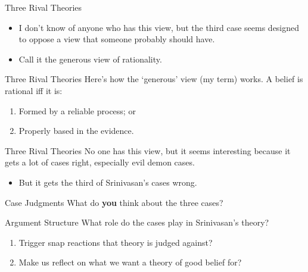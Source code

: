 \documentclass[
  17pt,
  letterpaper,
  ignorenonframetext,
  aspectratio=169,
]{beamer}
\providecommand{\tightlist}{%
  \setlength{\itemsep}{0pt}\setlength{\parskip}{0pt}}\usepackage{longtable,booktabs,array}
\begin{document}
\begin{frame}{Three Rival Theories}
\protect\hypertarget{three-rival-theories-2}{}
\begin{itemize}[<+->]
\tightlist
\item
  I don't know of anyone who has this view, but the third case seems
  designed to oppose a view that someone probably should have.
\item
  Call it the generous view of rationality.
\end{itemize}
\end{frame}

\begin{frame}{Three Rival Theories}
\protect\hypertarget{three-rival-theories-3}{}
Here's how the `generous' view (my term) works. A belief is rational iff
it is:

\begin{enumerate}[<+->]
\tightlist
\item
  Formed by a reliable process; or
\item
  Properly based in the evidence.
\end{enumerate}
\end{frame}

\begin{frame}{Three Rival Theories}
\protect\hypertarget{three-rival-theories-4}{}
No one has this view, but it seems interesting because it gets a lot of
cases right, especially evil demon cases.

\begin{itemize}[<+->]
\tightlist
\item
  But it gets the third of Srinivasan's cases wrong.
\end{itemize}
\end{frame}

\begin{frame}{Case Judgments}
\protect\hypertarget{case-judgments}{}
What do \textbf{you} think about the three cases?
\end{frame}

\begin{frame}{Argument Structure}
\protect\hypertarget{argument-structure}{}
What role do the cases play in Srinivasan's theory?

\begin{enumerate}[<+->]
\tightlist
\item
  Trigger snap reactions that theory is judged against?
\item
  Make us reflect on what we want a theory of good belief for?
\end{enumerate}
\end{frame}
\end{document}
